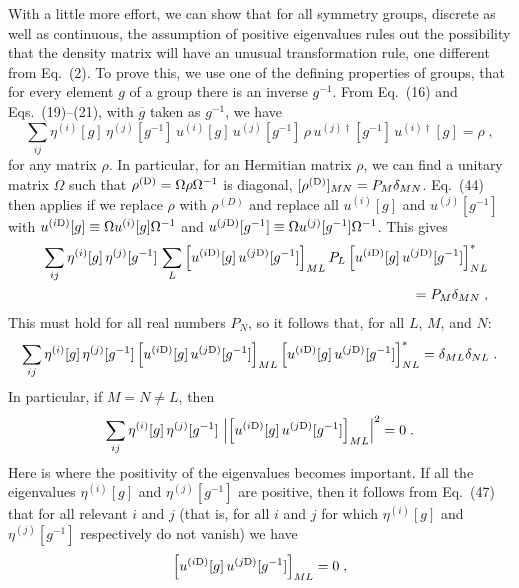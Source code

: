 \documentclass[12pt]{article}
\begin{document}
With a little more effort, we can show that for all symmetry groups, discrete as well as continuous, the assumption of positive eigenvalues rules out the possibility that the density matrix will have an unusual transformation rule, one different from Eq.~(2).   To prove this, we use one of the defining properties of groups, that for every element $g$ of a group there is an inverse $g^{-1}$.  From Eq.~(16) and Eqs.~(19)--(21), with $\overline{g}$ taken as $g^{-1}$, we have
\begin{equation}
\sum_{ij}\eta^{(i)}[g]\,\eta^{(j)}[g^{-1}]\,u^{(i)}[g]\,u^{(j)}[g^{-1}]\,\rho\,u^{(j)\dagger}[g^{-1}]\, u^{(i)\dagger}[g]=\rho\;,
\end{equation}
for any   matrix $\rho$.  In particular, for an Hermitian matrix $\rho$, we can find a unitary matrix $\Omega$ such that $\rho^{({\rm D})}=\Omega\rho\Omega^{-1}$ is  diagonal, $[\rho^{({\rm D})}]_{MN}=P_M\delta_{MN}$.  Eq.~(44) then applies if we replace $\rho$ with $\rho^{(D)}$ and replace all $u^{(i)}[g]$ and $u^{(j)}[g^{-1}]$ with $u^{(i{\rm D})}[g]\equiv \Omega u^{(i)}[g] \Omega^{-1}$ and $u^{(j{\rm D})}[g^{-1}]\equiv \Omega u^{(j)}[g^{-1}]\Omega^{-1}$.  This gives
\begin{eqnarray}
&&\sum_{ij}\eta^{(i)}[g]\,\eta^{(j)}[g^{-1}]\,\sum_L\Big[u^{(i{\rm D})}[g]\,u^{(j{\rm D})}[g^{-1}]\Big]_{ML}\,P_L\,\Big[u^{(i{\rm D})}[g]\,u^{(j{\rm D})}[g^{-1}] \Big]_{NL}^*\nonumber\\&&~~~~~~~~~~~=P_M\delta_{MN}\;,
\end{eqnarray}
This must hold for all real numbers $P_N$, so it follows that, for all $L$, $M$, and $N$:
\begin{equation}
\sum_{ij}\eta^{(i)}[g]\,\eta^{(j)}[g^{-1}]\,\Big[u^{(i{\rm D})}[g]\,u^{(j{\rm D})}[g^{-1}]\Big]_{ML}\,\Big[u^{(i{\rm D})}[g]\,u^{(j{\rm D})}[g^{-1}] \Big]_{NL}^*=\delta_{ML}\delta_{NL}\;.
\end{equation}
In particular, if $M=N\neq L$, then 
\begin{equation}
\sum_{ij}\eta^{(i)}[g]\,\eta^{(j)}[g^{-1}]\,\left|\Big[u^{(i{\rm D})}[g]\,u^{(j{\rm D})}[g^{-1}]\Big]_{ML}\right|^2=0\;.
\end{equation}
Here is where the positivity of the eigenvalues becomes important.  If all the eigenvalues 
$\eta^{(i)}[g]$ and $\eta^{(j)}[g^{-1}]$ are positive, then it follows from Eq.~(47) that for all relevant $i$ and $j$ (that is, for all $i$ and $j$ for which $\eta^{(i)}[g]$ and $\eta^{(j)}[g^{-1}]$ respectively do not vanish) we have
\begin{equation}
\Big[u^{(i{\rm D})}[g]\,u^{(j{\rm D})}[g^{-1}]\Big]_{ML}=0\;,
\end{equation}
\end{document}
